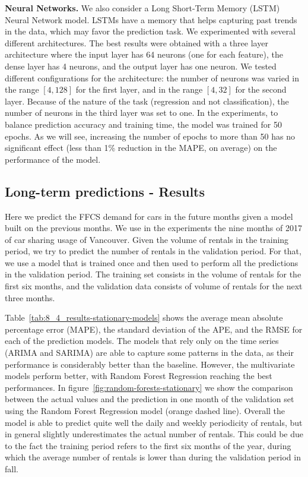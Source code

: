 \textbf{Neural Networks.} We also consider a  Long Short-Term Memory (LSTM) Neural Network  model. LSTMs have a memory that helps capturing past trends in the data, which may favor the prediction task. We experimented with several different architectures. The best results were obtained with a three layer architecture where the input layer has 64 neurons (one for each feature), the dense layer has 4 neurons, and the output layer has one neuron. %
We tested different configurations for the architecture: the number of neurons was varied in the range $[4, 128]$ for the first layer, and in the range $[4, 32]$ for the second layer. Because of the nature of the task (regression and not classification), the number of neurons in the third layer was set to one.
In the experiments, to balance prediction accuracy and training time, the model was trained for 50 epochs. As we will see, increasing the number of epochs to more than 50 has no significant effect (less than 1\% reduction in the MAPE, on average) on the performance of the model.



\subsection{Long-term predictions -  Results}

Here we predict the FFCS demand for cars in the future months given a model built on the previous months. We use in the experiments the nine months of 2017 of car sharing usage of Vancouver. 
Given the volume of rentals in the training period, we try to predict the number of rentals in the validation period. For that, we use a  model that is trained once and then used to perform all the predictions in the validation period. 
The training set consists in the volume of rentals for the first six months, and the validation data consists of volume of rentals for the next three months.

Table~\ref{tab:8_4_results-stationary-models} shows the average mean absolute percentage error (MAPE), the standard deviation of the APE, and the RMSE for each of the prediction models.
The models that rely only on the time series (ARIMA and SARIMA) are able to capture some patterns in the data, as their performance is considerably better than the baseline. However, the multivariate models perform better, with Random Forest Regression reaching the best performances. In figure~\ref{fig:random-forests-stationary} we show the comparison between the actual values and the prediction in one month of the validation set using the Random Forest Regression model (orange dashed line). Overall the model is able to predict quite well the daily and weekly periodicity of rentals, but in general slightly underestimates the actual number of rentals. This could be due to the fact the training period refers to the first six months of the year, during which the average number of rentals is lower than during the validation period in fall.




